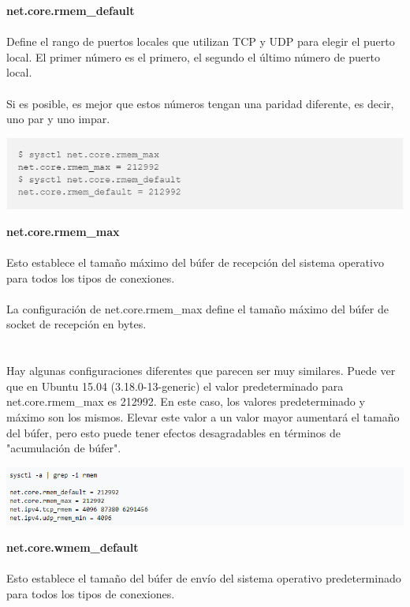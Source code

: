 {\bfseries  net.core.rmem\_default}
\\
\\Define el rango de puertos locales que utilizan TCP y UDP para elegir el puerto local. El primer número es el primero, el segundo el último número de puerto local. \\
\\Si es posible, es mejor que estos números tengan una paridad diferente, es decir, uno par y uno impar. 
\\
	\begin{center}
		\includegraphics[width=17cm]{./Imagenes/t} 
	\end{center} 

{\bfseries  net.core.rmem\_max}
\\
\\Esto establece el tamaño máximo del búfer de recepción del sistema operativo para todos los tipos de conexiones.
\\
\\La configuración de net.core.rmem\_max define el tamaño máximo del búfer de socket de recepción en bytes.\\
\\
\\Hay algunas configuraciones diferentes que parecen ser muy similares. Puede ver que en Ubuntu 15.04 (3.18.0-13-generic) el valor predeterminado para net.core.rmem\_max es 212992. En este caso, los valores predeterminado y máximo son los mismos. Elevar este valor a un valor mayor aumentará el tamaño del búfer, pero esto puede tener efectos desagradables en términos de "acumulación de búfer". \\
	\begin{center}
		\includegraphics[width=17cm]{./Imagenes/s} 
	\end{center} 


{\bfseries  net.core.wmem\_default}
\\
\\Esto establece el tamaño del búfer de envío del sistema operativo predeterminado para todos los tipos de conexiones.
\\

